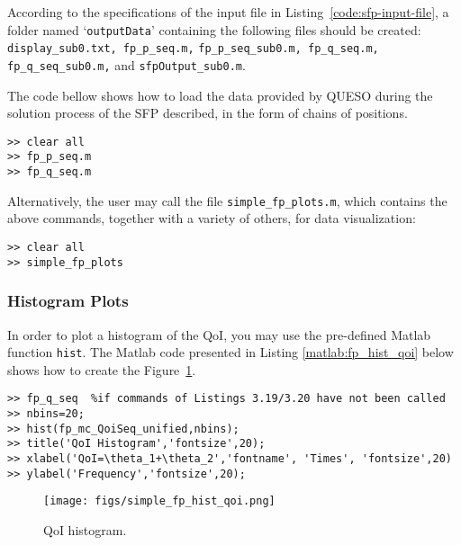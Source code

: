 According to the specifications of the input file in Listing~\ref{code:sfp-input-file}, a folder named `\verb+outputData+' containing the following files should be created: \verb+display_sub0.txt, fp_p_seq.m,+ \linebreak \verb+fp_p_seq_sub0.m, fp_q_seq.m, fp_q_seq_sub0.m,+ and \verb+sfpOutput_sub0.m+.

The code bellow shows how to load the data provided by QUESO during the solution process of the SFP described, in the form of chains of positions.
\begin{lstlisting}[caption={Matlab code for loading the data in both parameter and QoI chains of the SFP.}]
% inside Matlab
>> clear all
>> fp_p_seq.m
>> fp_q_seq.m
\end{lstlisting}


Alternatively, the user may call the file \texttt{simple\_fp\_plots.m}, which contains the above commands, together with a variety of others, for data visualization:
\begin{lstlisting}[caption={Matlab code for loading the data in both parameter and QoI chains of the SFP, by calling the file \texttt{simple\_fp\_plots.m}.}]
% inside Matlab
>> clear all
>> simple_fp_plots
\end{lstlisting}




\subsubsection{Histogram Plots}

In order to plot a histogram of the QoI, you may use the pre-defined Matlab function \verb+hist+.
The Matlab code presented in Listing \ref{matlab:fp_hist_qoi} below shows how to create the Figure~\ref{fig:fp_qoi_hist}.

\begin{lstlisting}[label=matlab:fp_hist_qoi,caption={Matlab code for the QoI histogram plot.}]
% inside Matlab
>> fp_q_seq  %if commands of Listings 3.19/3.20 have not been called
>> nbins=20;
>> hist(fp_mc_QoiSeq_unified,nbins);
>> title('QoI Histogram','fontsize',20);
>> xlabel('QoI=\theta_1+\theta_2','fontname', 'Times', 'fontsize',20)
>> ylabel('Frequency','fontsize',20);
\end{lstlisting}

\begin{figure}[htb]
\centering 
\texttt{[image: figs/simple\_fp\_hist\_qoi.png]}
\vspace{-10pt}
\caption{QoI histogram.}
\label{fig:fp_qoi_hist}
\end{figure}

